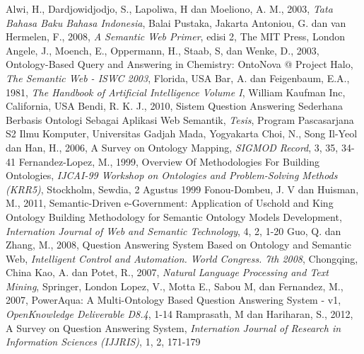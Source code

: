 \begin{thebibliography}{99}
		Alwi, H., Dardjowidjodjo, S., Lapoliwa, H dan Moeliono, A. M., 2003, \emph{Tata Bahasa Baku Bahasa Indonesia}, Balai Pustaka, Jakarta
		Antoniou, G. dan van Hermelen, F., 2008, \emph{A Semantic Web Primer}, edisi 2, The MIT Press, London
		Angele, J., Moench, E., Oppermann, H., Staab, S, dan Wenke, D., 2003, Ontology-Based Query and Answering in Chemistry: OntoNova @ Project Halo, \emph{The Semantic Web - ISWC 2003}, Florida, USA
		Bar, A. dan Feigenbaum, E.A., 1981, \emph{The Handbook of Artificial Intelligence Volume I}, William Kaufman Inc, California, USA
		Bendi, R. K. J., 2010, Sistem Question Answering Sederhana Berbasis Ontologi Sebagai Aplikasi Web Semantik, \emph{Tesis}, Program Pascasarjana S2 Ilmu Komputer, Universitas Gadjah Mada, Yogyakarta
		Choi, N., Song Il-Yeol dan Han, H., 2006, A Survey on Ontology Mapping, \emph{SIGMOD Record}, 3, 35, 34-41
		Fernandez-Lopez, M., 1999, Overview Of Methodologies For Building Ontologies, \emph{IJCAI-99 Workshop on Ontologies and Problem-Solving Methods (KRR5)}, Stockholm, Sewdia, 2 Agustus 1999
		Fonou-Dombeu, J. V dan Huisman, M., 2011, Semantic-Driven e-Government: Application of Uschold and King Ontology Building Methodology for Semantic Ontology Models Development, \emph{Internation Journal of Web and Semantic Technology}, 4, 2, 1-20
		Guo, Q. dan Zhang, M., 2008, Question Answering System Based on Ontology and Semantic Web, \emph{Intelligent Control and Automation. World Congress. 7th 2008}, Chongqing, China
		Kao, A. dan Potet, R., 2007, \emph{Natural Language Processing and Text Mining}, Springer, London
		Lopez, V., Motta E., Sabou M, dan Fernandez, M., 2007, PowerAqua: A Multi-Ontology Based Question Answering System - v1, \emph{OpenKnowledge Deliverable D8.4}, 1-14
		Ramprasath, M dan Hariharan, S., 2012, A Survey on Question Answering System, \emph{Internation Journal of Research in Information Sciences (IJJRIS)}, 1, 2, 171-179

\end{thebibliography}
